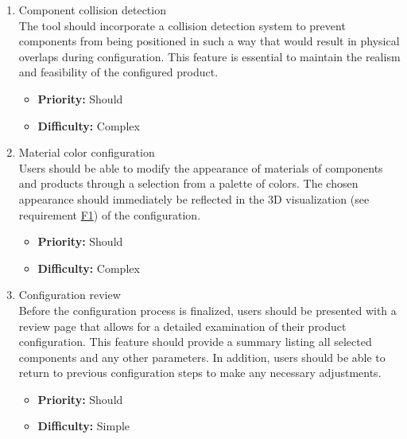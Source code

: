 \begin{enumerate}[label=\textbf{F\arabic*:}, leftmargin=30pt]
\item \label{itm:F7} Component collision detection
\vspace{2pt}
\\The tool should incorporate a collision detection system to prevent components from being positioned in such a way that would result in physical overlaps during configuration. This feature is essential to maintain the realism and feasibility of the configured product.
\begin{itemize}[noitemsep, label=\trianglebullet]
    \item \textbf{Priority:} Should
    \item \textbf{Difficulty:} Complex
\end{itemize}
\vspace{4pt}

\item \label{itm:F8} Material color configuration
\vspace{2pt}
\\Users should be able to modify the appearance of materials of components and products through a selection from a palette of colors. The chosen appearance should immediately be reflected in the 3D visualization (see requirement \hyperref[itm:F1]{F1}) of the configuration.
\begin{itemize}[noitemsep, label=\trianglebullet]
    \item \textbf{Priority:} Should
    \item \textbf{Difficulty:} Complex
\end{itemize}
\vspace{4pt}

\item \label{itm:F9} Configuration review
\vspace{2pt}
\\Before the configuration process is finalized, users should be presented with a review page that allows for a detailed examination of their product configuration. This feature should provide a summary listing all selected components and any other parameters. In addition, users should be able to return to previous configuration steps to make any necessary adjustments.
\begin{itemize}[noitemsep, label=\trianglebullet]
    \item \textbf{Priority:} Should
    \item \textbf{Difficulty:} Simple
\end{itemize}
\vspace{4pt}


\end{enumerate}

